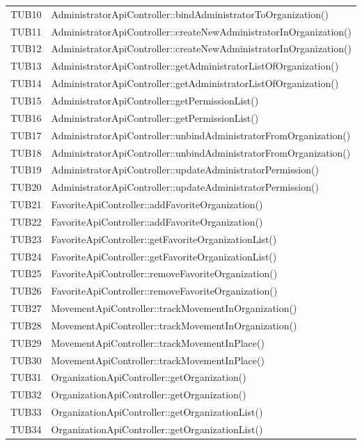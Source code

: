 {\begin{longtable}{C{2cm} C{8cm}}
		TUB10 & AdministratorApiController::bindAdministratorToOrganization()\\
		TUB11 & AdministratorApiController::createNewAdministratorInOrganization()\\
		TUB12 & AdministratorApiController::createNewAdministratorInOrganization()\\
		TUB13 & AdministratorApiController::getAdministratorListOfOrganization()\\
		TUB14 & AdministratorApiController::getAdministratorListOfOrganization()\\
		TUB15 & AdministratorApiController::getPermissionList()\\
		TUB16 & AdministratorApiController::getPermissionList()\\
		TUB17 & AdministratorApiController::unbindAdministratorFromOrganization()\\
		TUB18 & AdministratorApiController::unbindAdministratorFromOrganization()\\
		TUB19 & AdministratorApiController::updateAdministratorPermission()\\
		TUB20 & AdministratorApiController::updateAdministratorPermission()\\
		TUB21 & FavoriteApiController::addFavoriteOrganization()\\
		TUB22 & FavoriteApiController::addFavoriteOrganization()\\
		TUB23 & FavoriteApiController::getFavoriteOrganizationList()\\
		TUB24 & FavoriteApiController::getFavoriteOrganizationList()\\
		TUB25 & FavoriteApiController::removeFavoriteOrganization()\\
		TUB26 & FavoriteApiController::removeFavoriteOrganization()\\
		TUB27 & MovementApiController::trackMovementInOrganization()\\
		TUB28 & MovementApiController::trackMovementInOrganization()\\
		TUB29 & MovementApiController::trackMovementInPlace()\\
		TUB30 & MovementApiController::trackMovementInPlace()\\
		TUB31 & OrganizationApiController::getOrganization()\\
		TUB32 & OrganizationApiController::getOrganization()\\
		TUB33 & OrganizationApiController::getOrganizationList()\\
		TUB34 & OrganizationApiController::getOrganizationList()\\

\end{longtable}}
